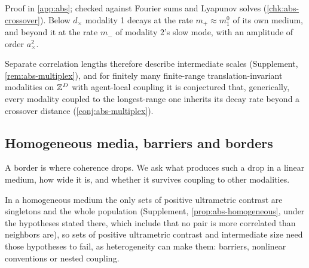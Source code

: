 Proof in \cref{app:abs}; checked against Fourier sums and Lyapunov solves (\cref{chk:abs-crossover}). Below $d_\times$ modality 1 decays at the rate $m_+\approx m^0_1$ of its own medium, and beyond it at the rate $m_-$ of modality 2's slow mode, with an amplitude of order $a_\times^2$.

Separate correlation lengths therefore describe intermediate scales (Supplement, \cref{rem:abs-multiplex}), and for finitely many finite-range translation-invariant modalities on $\mathbb{Z}^D$ with agent-local coupling it is conjectured that, generically, every modality coupled to the longest-range one inherits its decay rate beyond a crossover distance (\cref{conj:abs-multiplex}).

\subsection{Homogeneous media, barriers and borders}\label{sec:abs-barriers}

A border is where coherence drops. We ask what produces such a drop in a linear medium, how wide it is, and whether it survives coupling to other modalities.

In a homogeneous medium the only sets of positive ultrametric contrast are singletons and the whole population (Supplement, \cref{prop:abs-homogeneous}, under the hypotheses stated there, which include that no pair is more correlated than neighbors are), so sets of positive ultrametric contrast and intermediate size need those hypotheses to fail, as heterogeneity can make them: barriers, nonlinear conventions or nested coupling.

